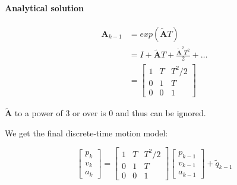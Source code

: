\paragraph{Analytical solution}
\begin{align}
    \mathbf{A}_{k-1} & = exp(\mathbf{\tilde{A}}T) \\
    &= I + \mathbf{\tilde{A}}T + \frac{\mathbf{\tilde{A}}^2T^2}{2} + \dots \\
    &= \left[\begin{array}{ccc}
        1 & T & T^2/2 \\
        0 & 1 & T \\
        0 & 0 & 1
        \end{array}\right]
\end{align}

$\mathbf{\tilde{A}}$ to a power of 3 or over is 0 and thus can be ignored.


We get the final discrete-time motion model:

\begin{equation}
    \left[\begin{array}{c}
        p_k \\
        v_k \\
        a_k
    \end{array}\right] = \left[\begin{array}{ccc}
        1 & T & T^2/2 \\
        0 & 1 & T \\
        0 & 0 & 1
    \end{array}\right]\left[\begin{array}{c}
        p_{k-1} \\
        v_{k-1} \\
        a_{k-1}
    \end{array}\right] + \tilde{q}_{k-1}
\end{equation}






